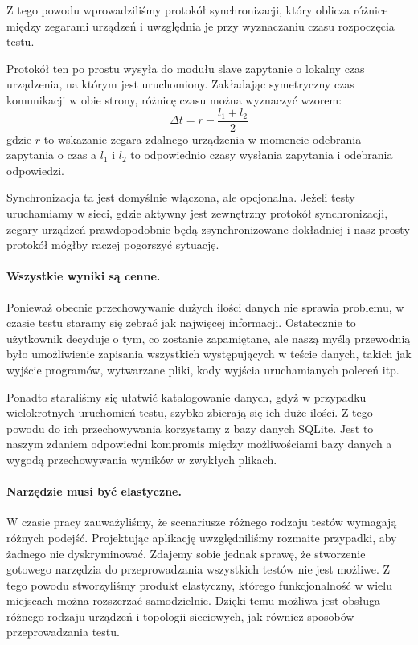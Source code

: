 \documentclass[00-praca-magisterska.tex]{subfiles}
\begin{document}
Z tego powodu wprowadziliśmy protokół synchronizacji, który oblicza różnice
między zegarami urządzeń i uwzględnia je przy wyznaczaniu czasu rozpoczęcia
testu.

Protokół ten po prostu wysyła do modułu slave zapytanie o lokalny czas
urządzenia, na którym jest uruchomiony. Zakładając symetryczny czas komunikacji
w obie strony, różnicę czasu można wyznaczyć wzorem: $$\Delta t = r - \frac{l_1
+ l_2}{2}$$ gdzie $r$ to wskazanie zegara zdalnego urządzenia w momencie
odebrania zapytania o czas a $l_1$ i $l_2$ to odpowiednio czasy wysłania
zapytania i odebrania odpowiedzi.

Synchronizacja ta jest domyślnie włączona, ale opcjonalna. Jeżeli testy
uruchamiamy w sieci, gdzie aktywny jest zewnętrzny protokół synchronizacji,
zegary urządzeń prawdopodobnie będą zsynchronizowane dokładniej i nasz prosty
protokół mógłby raczej pogorszyć sytuację.

\paragraph{Wszystkie wyniki są cenne.} Ponieważ obecnie przechowywanie dużych
ilości danych nie sprawia problemu, w czasie testu staramy się zebrać jak
najwięcej informacji. Ostatecznie to użytkownik decyduje o tym, co zostanie
zapamiętane, ale naszą myślą przewodnią było umożliwienie zapisania wszystkich
występujących w teście danych, takich jak wyjście programów, wytwarzane pliki,
kody wyjścia uruchamianych poleceń itp.

Ponadto staraliśmy się ułatwić katalogowanie danych, gdyż w przypadku
wielokrotnych uruchomień testu, szybko zbierają się ich duże ilości. Z tego
powodu do ich przechowywania korzystamy z bazy danych SQLite. Jest to naszym
zdaniem odpowiedni kompromis między możliwościami bazy danych a wygodą
przechowywania wyników w zwykłych plikach.

\paragraph{Narzędzie musi być elastyczne.} W czasie pracy zauważyliśmy, że
scenariusze różnego rodzaju testów wymagają różnych podejść. Projektując
aplikację uwzględniliśmy rozmaite przypadki, aby żadnego nie dyskryminować.
Zdajemy sobie jednak sprawę, że stworzenie gotowego narzędzia do przeprowadzania
wszystkich testów nie jest możliwe. Z tego powodu stworzyliśmy produkt
elastyczny, którego funkcjonalność w wielu miejscach można rozszerzać
samodzielnie. Dzięki temu możliwa jest obsługa różnego rodzaju urządzeń i
topologii sieciowych, jak również sposobów przeprowadzania testu.
\end{document}
